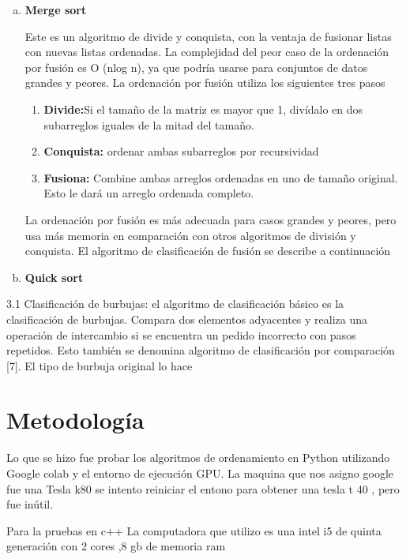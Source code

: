 \documentclass[a4paper]{article}
\begin{document}
\begin{enumerate}[a)]
\item \textbf{Merge sort}

Este es un algoritmo de divide y conquista, con la ventaja  de fusionar listas con nuevas listas ordenadas. La complejidad del peor caso de la ordenación por fusión es O (nlog n), ya que podría usarse para conjuntos de datos grandes y peores. 
La ordenación por fusión utiliza los siguientes tres pasos \cite{merge} 

\begin{enumerate}[1)]
\item \textbf{Divide:}Si el tamaño de la matriz es mayor que 1, divídalo en dos subarreglos iguales de la mitad del tamaño.
\item \textbf{Conquista:} ordenar ambas subarreglos por recursividad
\item \textbf{Fusiona:} Combine ambas arreglos ordenadas en uno de tamaño original. Esto le dará un arreglo ordenada completo.


\end{enumerate}



 La ordenación por fusión es más adecuada para casos grandes y peores, pero usa más memoria en comparación con otros algoritmos de división y conquista. El algoritmo de clasificación de fusión se describe a continuación

\item \textbf{Quick sort}


\end{enumerate}


3.1 Clasificación de burbujas: el algoritmo de clasificación básico es la clasificación de burbujas. Compara dos elementos adyacentes y realiza una operación de intercambio si se encuentra un pedido incorrecto con pasos repetidos. Esto también se denomina algoritmo de clasificación por comparación [7]. El tipo de burbuja original lo hace 


\section{Metodología}

Lo que se hizo fue probar los algoritmos de ordenamiento  en Python 
utilizando Google colab y el entorno de ejecución GPU. La maquina que nos asigno google fue una Tesla k80 se intento reiniciar el entono para obtener una tesla t 40 , pero fue inútil.

Para la pruebas en c++
La computadora  que utilizo es una intel i5 de quinta generación  con 2 cores ,8 gb  de memoria ram 
\end{document}
